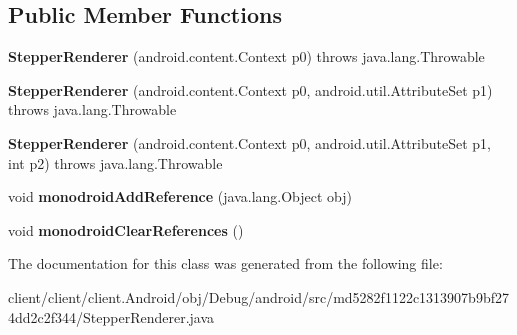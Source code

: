 \subsection*{Public Member Functions}
\begin{DoxyCompactItemize}
\item 
\hypertarget{classmd5282f1122c1313907b9bf274dd2c2f344_1_1StepperRenderer_a9dc9da1475fa7e4c194bf148b373a9a4}{}{\bfseries Stepper\+Renderer} (android.\+content.\+Context p0)  throws java.\+lang.\+Throwable 	\label{classmd5282f1122c1313907b9bf274dd2c2f344_1_1StepperRenderer_a9dc9da1475fa7e4c194bf148b373a9a4}

\item 
\hypertarget{classmd5282f1122c1313907b9bf274dd2c2f344_1_1StepperRenderer_af63ec92bfc116cef8a27b3272af717af}{}{\bfseries Stepper\+Renderer} (android.\+content.\+Context p0, android.\+util.\+Attribute\+Set p1)  throws java.\+lang.\+Throwable 	\label{classmd5282f1122c1313907b9bf274dd2c2f344_1_1StepperRenderer_af63ec92bfc116cef8a27b3272af717af}

\item 
\hypertarget{classmd5282f1122c1313907b9bf274dd2c2f344_1_1StepperRenderer_a0d052271c5ef2f5545fccad98754bbcd}{}{\bfseries Stepper\+Renderer} (android.\+content.\+Context p0, android.\+util.\+Attribute\+Set p1, int p2)  throws java.\+lang.\+Throwable 	\label{classmd5282f1122c1313907b9bf274dd2c2f344_1_1StepperRenderer_a0d052271c5ef2f5545fccad98754bbcd}

\item 
\hypertarget{classmd5282f1122c1313907b9bf274dd2c2f344_1_1StepperRenderer_a548a759e9fb6b69d40573e65114b7acd}{}void {\bfseries monodroid\+Add\+Reference} (java.\+lang.\+Object obj)\label{classmd5282f1122c1313907b9bf274dd2c2f344_1_1StepperRenderer_a548a759e9fb6b69d40573e65114b7acd}

\item 
\hypertarget{classmd5282f1122c1313907b9bf274dd2c2f344_1_1StepperRenderer_ad5aeb13a0b1e7738cb28e9ffa1788bd9}{}void {\bfseries monodroid\+Clear\+References} ()\label{classmd5282f1122c1313907b9bf274dd2c2f344_1_1StepperRenderer_ad5aeb13a0b1e7738cb28e9ffa1788bd9}

\end{DoxyCompactItemize}


The documentation for this class was generated from the following file\+:\begin{DoxyCompactItemize}
\item 
client/client/client.\+Android/obj/\+Debug/android/src/md5282f1122c1313907b9bf274dd2c2f344/Stepper\+Renderer.\+java\end{DoxyCompactItemize}
